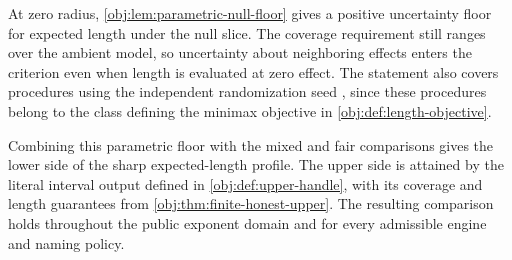 \documentclass[11pt]{article}
\begin{document}
At zero radius, \cref{obj:lem:parametric-null-floor} gives a positive uncertainty floor for expected length under the null slice. The coverage requirement still ranges over the ambient model, so uncertainty about neighboring effects enters the criterion even when length is evaluated at zero effect. The statement also covers procedures using the independent randomization seed , since these procedures belong to the class defining the minimax objective in \cref{obj:def:length-objective}.

Combining this parametric floor with the mixed and fair comparisons gives the lower side of the sharp expected-length profile. The upper side is attained by the literal interval output  defined in \cref{obj:def:upper-handle}, with its coverage and length guarantees from \cref{obj:thm:finite-honest-upper}. The resulting comparison holds throughout the public exponent domain  and for every admissible engine and naming policy.
\end{document}

